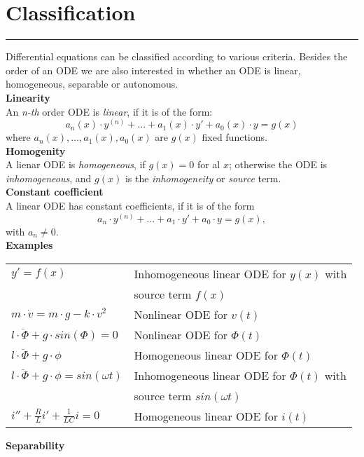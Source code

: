 \section{Classification}
\noindent\rule[\linienAbstand]{\linewidth}{\linienDickeDick}

Differential equations can be classified according to various criteria. Besides the order of an ODE we are also interested in whether an ODE is linear, homogeneous, separable or autonomous.\\

\textbf{Linearity}\\
An \emph{n-th} order ODE is \emph{linear}, if it is of the form:
\begin{equation*}
  a_n(x) \cdot y^{(n)} + ... + a_1(x) \cdot y' + a_0(x) \cdot y = g(x)
\end{equation*}
where $a_n(x), ..., a_1(x), a_0(x)$ are $g(x)$ fixed functions.\\

\textbf{Homogenity}\\
A lienar ODE is \emph{homogeneous}, if $g(x) = 0$ for al $x$; otherwise the ODE is \emph{inhomogeneous}, and $g(x)$ is the \emph{inhomogeneity} or \emph{source} term.\\

\textbf{Constant coefficient}\\
A linear ODE has constant coefficients, if it is of the form
\begin{equation*}
  a_n \cdot y^{(n)} + ... + a_1 \cdot y'+ a_0 \cdot y = g(x),
\end{equation*}
with $a_n \neq 0$.\\

\textbf{Examples}\\
\begin{tabular}{ll}
  $y' = f(x)$ & Inhomogeneous linear ODE for $y(x)$ with\\
  & source term $f(x)$\\
  $m \cdot \dot{v} = m \cdot g - k \cdot v^2$ & Nonlinear ODE for $v(t)$\\
  $l \cdot \ddot{\Phi} + g \cdot sin(\Phi) = 0$ & Nonlinear ODE for $\Phi(t)$\\
  $l \cdot \ddot{\Phi} + g \cdot \phi$ & Homogeneous linear ODE for $\Phi(t)$\\
  $l \cdot \ddot{\Phi} + g \cdot \phi = sin(\omega t)$ & Inhomogeneous linear ODE for $\Phi(t)$ with\\
  & source term $sin(\omega t)$\\
  $i''+ \frac{R}{L}i' + \frac{1}{LC}i = 0$ & Homogeneous linear ODE for $i(t)$
\end{tabular}

\textbf{Separability}\\
